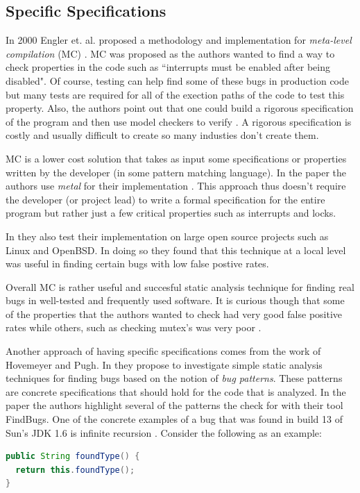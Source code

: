 \documentclass[10pt,oneside]{IEEEtran}
\begin{document}
\subsection{Specific Specifications}
In 2000 Engler et. al. proposed a methodology and implementation for \textit{meta-level compilation} (MC) \cite{5}. MC was proposed as the authors wanted to find a way to check properties in the code such as ``interrupts must be enabled after being disabled". Of course, testing can help find some of these bugs in production code but many tests are required for all of the exection paths of the code to test this property. Also, the authors point out that one could build a rigorous specification of the program and then use model checkers to verify \cite{5}. A rigorous specification is costly and usually difficult to create so many industies don't create them.

MC is a lower cost solution that takes as input some specifications or properties written by the developer (in some pattern matching language). In the paper the authors use \textit{metal} for their implementation \cite{5}. This approach thus doesn't require the developer (or project lead) to write a formal specification for the entire program but rather just a few critical properties such as interrupts and locks.

In \cite{5} they also test their implementation on large open source projects such as Linux and OpenBSD. In doing so they found that this technique at a local level was useful in finding certain bugs with low false postive rates.


Overall MC is rather useful and succesful static analysis technique for finding real bugs in well-tested and frequently used software. It is curious though that some of the properties that the authors wanted to check had very good false positive rates while others, such as checking mutex's was very poor \cite{5}.

Another approach of having specific specifications comes from the work of Hovemeyer and Pugh. In \cite{6} they propose to investigate simple static analysis techniques for finding bugs based on the notion of \textit{bug patterns}. These patterns are concrete specifications that should hold for the code that is analyzed. In the paper the authors highlight several of the patterns the check for with their tool FindBugs. One of the concrete examples of a bug that was found in build 13 of Sun's JDK 1.6 is infinite recursion \cite{8}. Consider the following as an example:
\begin{lstlisting}[language=Java]
public String foundType() {
  return this.foundType();
}
\end{lstlisting}
\end{document}
